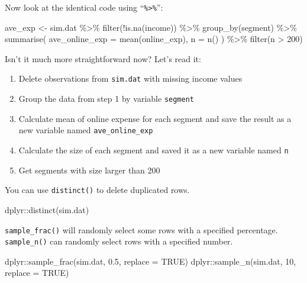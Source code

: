 \documentclass[
  12pt,
]{krantz}
\makeatletter
\newenvironment{Shaded}{\begin{snugshade}}{\end{snugshade}}
\newcommand{\AttributeTok}[1]{\textcolor[rgb]{0.61,0.61,0.61}{#1}}
\newcommand{\ConstantTok}[1]{\textcolor[rgb]{0,0,0}{#1}}
\newcommand{\DecValTok}[1]{\textcolor[rgb]{0.06,0.06,0.06}{#1}}
\newcommand{\FloatTok}[1]{\textcolor[rgb]{0.06,0.06,0.06}{#1}}
\newcommand{\FunctionTok}[1]{\textcolor[rgb]{0,0,0}{#1}}
\newcommand{\NormalTok}[1]{#1}
\newcommand{\OtherTok}[1]{\textcolor[rgb]{0.37,0.37,0.37}{#1}}
\newcommand{\SpecialCharTok}[1]{\textcolor[rgb]{0,0,0}{#1}}
\providecommand{\tightlist}{%
  \setlength{\itemsep}{0pt}\setlength{\parskip}{0pt}}
\newenvironment{kframe}{%
\medskip{}
\setlength{\fboxsep}{.8em}
 \def\at@end@of@kframe{}%
 \ifinner\ifhmode%
  \def\at@end@of@kframe{\end{minipage}}%
  \begin{minipage}{\columnwidth}%
 \fi\fi%
 \def\FrameCommand##1{\hskip\@totalleftmargin \hskip-\fboxsep
 \colorbox{shadecolor}{##1}\hskip-\fboxsep
     \hskip-\linewidth \hskip-\@totalleftmargin \hskip\columnwidth}%
 \MakeFramed {\advance\hsize-\width
   \@totalleftmargin\z@ \linewidth\hsize
   \@setminipage}}%
 {\par\unskip\endMakeFramed%
 \at@end@of@kframe}
\renewenvironment{Shaded}{\begin{kframe}}{\end{kframe}}
\makeatother
\begin{document}
Now look at the identical code using ``\texttt{\%\textgreater{}\%}'':

\begin{Shaded}
\begin{Highlighting}[]
\NormalTok{ave\_exp }\OtherTok{\textless{}{-}}\NormalTok{ sim.dat }\SpecialCharTok{\%\textgreater{}\%} 
 \FunctionTok{filter}\NormalTok{(}\SpecialCharTok{!}\FunctionTok{is.na}\NormalTok{(income)) }\SpecialCharTok{\%\textgreater{}\%} 
 \FunctionTok{group\_by}\NormalTok{(segment) }\SpecialCharTok{\%\textgreater{}\%} 
 \FunctionTok{summarise}\NormalTok{( }
   \AttributeTok{ave\_online\_exp =} \FunctionTok{mean}\NormalTok{(online\_exp), }
   \AttributeTok{n =} \FunctionTok{n}\NormalTok{() ) }\SpecialCharTok{\%\textgreater{}\%} 
  \FunctionTok{filter}\NormalTok{(n }\SpecialCharTok{\textgreater{}} \DecValTok{200}\NormalTok{)}
\end{Highlighting}
\end{Shaded}

Isn't it much more straightforward now? Let's read it:

\begin{enumerate}
\def\labelenumi{\arabic{enumi}.}
\tightlist
\item
  Delete observations from \texttt{sim.dat} with missing income values
\item
  Group the data from step 1 by variable \texttt{segment}
\item
  Calculate mean of online expense for each segment and save the result as a new variable named \texttt{ave\_online\_exp}
\item
  Calculate the size of each segment and saved it as a new variable named \texttt{n}
\item
  Get segments with size larger than 200
\end{enumerate}

You can use \texttt{distinct()} to delete duplicated rows.

\begin{Shaded}
\begin{Highlighting}[]
\NormalTok{dplyr}\SpecialCharTok{::}\FunctionTok{distinct}\NormalTok{(sim.dat)}
\end{Highlighting}
\end{Shaded}

\texttt{sample\_frac()} will randomly select some rows with a specified percentage. \texttt{sample\_n()} can randomly select rows with a specified number.

\begin{Shaded}
\begin{Highlighting}[]
\NormalTok{dplyr}\SpecialCharTok{::}\FunctionTok{sample\_frac}\NormalTok{(sim.dat, }\FloatTok{0.5}\NormalTok{, }\AttributeTok{replace =} \ConstantTok{TRUE}\NormalTok{) }
\NormalTok{dplyr}\SpecialCharTok{::}\FunctionTok{sample\_n}\NormalTok{(sim.dat, }\DecValTok{10}\NormalTok{, }\AttributeTok{replace =} \ConstantTok{TRUE}\NormalTok{) }
\end{Highlighting}
\end{Shaded}
\end{document}
